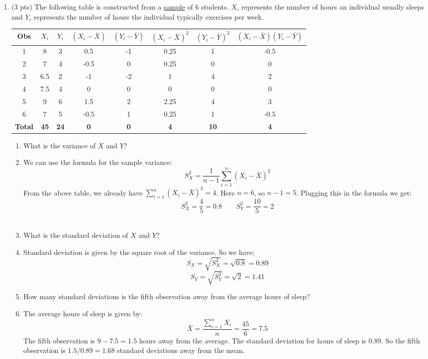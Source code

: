 \documentclass{./../../Latex/handout}
\begin{document}
\begin{enumerate}
\item (3 pts) The following table is constructed from a \underline{sample} of 6 students. $X_i$ represents the number of hours an individual usually sleeps and $Y_i$ represents the number of hours the individual typically exercises per week.  
\begin{center}
\footnotesize
\def\arraystretch{1.5}%
\begin{tabular}{|c|c|c|c|c|c|c|c|}
\hline
Obs & $X_i$ & $Y_i$ & $(X_i-\bar{X})$ & $(Y_i-\bar{Y})$ & $(X_i-\bar{X})^2$ & $(Y_i-\bar{Y})^2$ & $(X_i-\bar{X})(Y_i-\bar{Y})$  \\ \hline
1 & 8 & 3 & 0.5 & -1 & 0.25 & 1 & -0.5 \\ \hline
2 & 7 & 4 & -0.5 & 0 & 0.25 & 0 & 0 \\ \hline
3 & 6.5 & 2 & -1 & -2 & 1 & 4 & 2 \\ \hline
4 & 7.5 & 4 & 0 & 0 & 0 & 0 & 0 \\ \hline
5 & 9 & 6 & 1.5 & 2 & 2.25 & 4 & 3 \\ \hline
6 & 7 & 5 & -0.5 & 1 & 0.25 & 1 & -0.5 \\ \hline
\textbf{Total} & \textbf{45} & \textbf{24} & \textbf{0} & \textbf{0} & \textbf{4} & \textbf{10} & \textbf{4} \\ \hline
\end{tabular}
\end{center}
\begin{enumerate}
\item What is the variance of $X$ and $Y$? 
\item [] We can use the formula for the sample variance:
$$ S_X^2 = \frac{1}{n-1} \sum_{i=1}^n (X_i-\bar{X})^2 $$
From the above table, we already have $\sum_{i=1}^n (X_i-\bar{X})^2 = 4$. Here $n=6$, so $n-1=5$. Plugging this in the formula we get: 
$$ S_X^2 = \frac{4}{5} = 0.8 \quad \quad  S_Y^2 = \frac{10}{5} = 2 $$ \\
\item What is the standard deviation of $X$ and $Y$? 
\item [] Standard deviation is given by the square root of the variance. So we have: $$ S_X = \sqrt{S^2_X} = \sqrt{0.8} = 0.89 $$
 $$ S_Y = \sqrt{S^2_Y} = \sqrt{2} = 1.41 $$
\item How many standard deviations is the fifth observation away from the average hours of sleep? 
\item [] The average hours of sleep is given by:
 $$ \bar{X} = \frac{\sum_{i=1}^n X_i}{n} = \frac{45}{6} = 7.5 $$  The fifth observation is $9-7.5=1.5$ hours away from the average. The standard deviation for hours of sleep is 0.89. So the fifth observation is $1.5/0.89 = 1.68$ standard deviations away from the mean. \\

\end{enumerate}
\end{enumerate}
\end{document}
